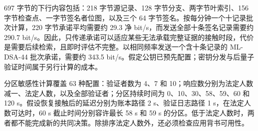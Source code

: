 697 字节的下行内容包括：218 字节源记录、128 字节分支、两字节叶索引、156 字节检查点、一字节签名者位图，以及三个 64 字节签名。按每分钟一个十记录批次计算，220 字节承诺平均需要约 29.3 净 bit/s，而发送全部十条签名记录需要约 290.7 bit/s。因此，只传递承诺可以适应某些无法承载完整证据的接触时段，代价是需要后续检索，且即时评估不完整。以相同频率发送一个含十条记录的 ML-DSA-44 批次承诺，需要约 343.5 bit/s。假定公钥已预先配置；密钥分发与后量子验证时间属于另行计算的成本。

分区敏感性计算覆盖 63 种配置：验证者数为 4、7 和 10；响应数分别为法定人数减一、法定人数，以及全部验证者；分区持续时间为 0、10、30、58、59、60 和 120 s。假设恢复接触后的延迟分别为账本路径 2 s、验证日志路径 1 s，在法定人数可达时，60 s 截止时间分别容许最长 58 s 和 59 s 的分区。低于法定人数时，两者都不能完成新的共同决策。除排序法定人数外，还必须检查应用背书可用性。
